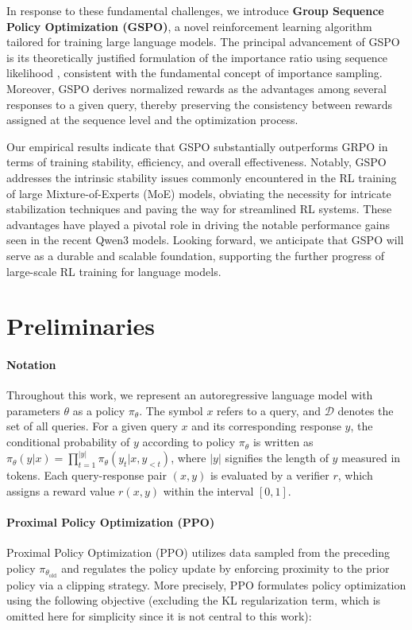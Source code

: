 In response to these fundamental challenges, we introduce \textbf{Group Sequence Policy Optimization (GSPO)}, a novel reinforcement learning algorithm tailored for training large language models. The principal advancement of GSPO is its theoretically justified formulation of the importance ratio using sequence likelihood \citep{click}, consistent with the fundamental concept of importance sampling. Moreover, GSPO derives normalized rewards as the advantages among several responses to a given query, thereby preserving the consistency between rewards assigned at the sequence level and the optimization process.

Our empirical results indicate that GSPO substantially outperforms GRPO in terms of training stability, efficiency, and overall effectiveness. Notably, GSPO addresses the intrinsic stability issues commonly encountered in the RL training of large Mixture-of-Experts (MoE) models, obviating the necessity for intricate stabilization techniques and paving the way for streamlined RL systems. These advantages have played a pivotal role in driving the notable performance gains seen in the recent Qwen3 models. Looking forward, we anticipate that GSPO will serve as a durable and scalable foundation, supporting the further progress of large-scale RL training for language models.

\section{Preliminaries}

\paragraph{Notation}
Throughout this work, we represent an autoregressive language model with parameters $\theta$ as a policy $\pi_\theta$.
The symbol $x$ refers to a query, and $\mathcal{D}$ denotes the set of all queries. For a given query $x$ and its corresponding response $y$, the conditional probability of $y$ according to policy $\pi_\theta$ is written as $\pi_\theta (y | x)=\prod_{t=1}^{|y|} \pi_\theta (y_t | x, y_{<t} )$, where $|y|$ signifies the length of $y$ measured in tokens. Each query-response pair $(x, y)$ is evaluated by a verifier $r$, which assigns a reward value $r(x, y)$ within the interval $[ 0, 1 ]$.

\paragraph{Proximal Policy Optimization (PPO)} Proximal Policy Optimization (PPO) \citep{ppo} utilizes data sampled from the preceding policy $\pi_{\theta_\text{old}}$ and regulates the policy update by enforcing proximity to the prior policy via a clipping strategy. More precisely, PPO formulates policy optimization using the following objective (excluding the KL regularization term, which is omitted here for simplicity since it is not central to this work):

